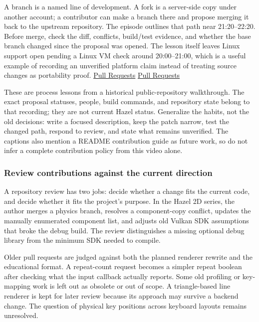 A branch is a named line of development. A fork is a server-side copy under another account; a contributor can make a branch there and propose merging it back to the upstream repository. The episode outlines that path near 21:20--22:20. Before merge, check the diff, conflicts, build/test evidence, and whether the base branch changed since the proposal was opened. The lesson itself leaves Linux support open pending a Linux VM check around 20:00--21:00, which is a useful example of recording an unverified platform claim instead of treating source changes as portability proof. \href{https://www.youtube.com/watch?v=h0OgLT6KJi8&t=1280s}{Pull Requests} \href{https://www.youtube.com/watch?v=h0OgLT6KJi8&t=1200s}{Pull Requests}

These are process lessons from a historical public-repository walkthrough. The exact proposal statuses, people, build commands, and repository state belong to that recording; they are not current Hazel status. Generalize the habits, not the old decisions: write a focused description, keep the patch narrow, test the changed path, respond to review, and state what remains unverified. The captions also mention a README contribution guide as future work, so do not infer a complete contribution policy from this video alone.

\subsubsection{Review contributions against the current direction}\label{06-engine-ii-ch040-review-contributions-against-the-current-direction}

\hypertarget{06-engine-ii-ch040-review-contributions-against-the-current-direction}{}

A repository review has two jobs: decide whether a change fits the current code, and decide whether it fits the project's purpose. In the Hazel 2D series, the author merges a physics branch, resolves a component-copy conflict, updates the manually enumerated component list, and adjusts old Vulkan SDK assumptions that broke the debug build. The review distinguishes a missing optional debug library from the minimum SDK needed to compile.

Older pull requests are judged against both the planned renderer rewrite and the educational format. A repeat-count request becomes a simpler repeat boolean after checking what the input callback actually reports. Some old profiling or key-mapping work is left out as obsolete or out of scope. A triangle-based line renderer is kept for later review because its approach may survive a backend change. The question of physical key positions across keyboard layouts remains unresolved.

